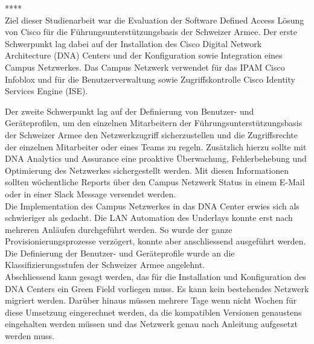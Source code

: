 **** \\
Ziel dieser Studienarbeit war die Evaluation der Software Defined Access Lösung von Cisco für die Führungsunterstützungsbasis der Schweizer Armee. Der erste Schwerpunkt lag dabei auf der Installation des Cisco Digital Network Architecture (DNA) Centers und der Konfiguration sowie Integration eines Campus Netzwerkes. Das Campus Netzwerk verwendet für das IPAM Cisco Infoblox und für die Benutzerverwaltung sowie Zugriffskontrolle Cisco Identity Services Engine (ISE).

Der zweite Schwerpunkt lag auf der Definierung von Benutzer- und Geräteprofilen, um den einzelnen Mitarbeitern der Führungsunterstützungsbasis der Schweizer Armee den Netzwerkzugriff sicherzustellen und die Zugriffsrechte der einzelnen Mitarbeiter oder eines Teams zu regeln. Zusätzlich hierzu sollte mit DNA Analytics und Assurance eine proaktive Überwachung, Fehlerbehebung und Optimierung des Netzwerkes sichergestellt werden. Mit diesen Informationen sollten wöchentliche Reports über den Campus Netzwerk Status in einem E-Mail oder in einer Slack Message versendet werden.
\\

Die Implementation des Campus Netzwerkes in das DNA Center erwies sich als schwieriger als gedacht. Die LAN Automation des Underlays konnte erst nach mehreren Anläufen durchgeführt werden. So wurde der ganze Provisionierungsprozesse verzögert, konnte aber anschliessend ausgeführt werden. Die Definierung der Benutzer- und Geräteprofile wurde an die Klassifizierungsstufen der Schweizer Armee angelehnt.
\\

Abschliessend kann gesagt werden, das für die Installation und Konfiguration des DNA Centers ein Green Field vorliegen muss. Es kann kein bestehendes Netzwerk migriert werden. Darüber hinaus müssen mehrere Tage wenn nicht Wochen für diese Umsetzung eingerechnet werden, da die kompatiblen Versionen genaustens eingehalten werden müssen und das Netzwerk genau nach Anleitung aufgesetzt werden muss.


